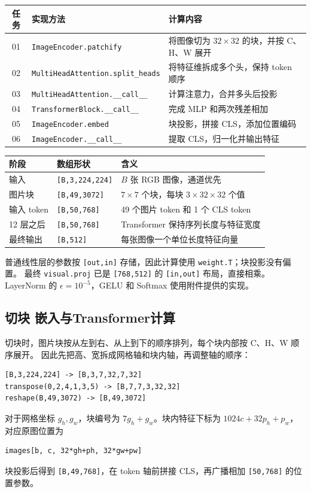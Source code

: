 \documentclass[a4paper,12pt]{article}
\newcommand{\shape}[1]{\texttt{#1}}
\newcommand{\file}[1]{\nolinkurl{#1}}
\begin{document}
\noindent\begin{tabularx}{\textwidth}{@{}c>{\raggedright\arraybackslash}p{5.1cm}X@{}}
\toprule
\textbf{任务} & \textbf{实现方法} & \textbf{计算内容} \\
\midrule
01 & \file{ImageEncoder.patchify} & 将图像切为 $32\times32$ 的块，并按 C、H、W 展开 \\
02 & \file{MultiHeadAttention.split_heads} & 将特征维拆成多个头，保持 token 顺序 \\
03 & \file{MultiHeadAttention.__call__} & 计算注意力，合并多头后投影 \\
04 & \file{TransformerBlock.__call__} & 完成 MLP 和两次残差相加 \\
05 & \file{ImageEncoder.embed} & 块投影，拼接 CLS，添加位置编码 \\
06 & \file{ImageEncoder.__call__} & 提取 CLS，归一化并输出特征 \\
\bottomrule
\end{tabularx}
\noindent\begin{tabularx}{\textwidth}{@{}l l X@{}}
\toprule
\textbf{阶段} & \textbf{数组形状} & \textbf{含义} \\
\midrule
输入 & \shape{[B,3,224,224]} & $B$ 张 RGB 图像，通道优先 \\
图片块 & \shape{[B,49,3072]} & $7\times7$ 个块，每块 $3\times32\times32$ 个值 \\
输入 token & \shape{[B,50,768]} & 49 个图片 token 和 1 个 CLS token \\
12 层之后 & \shape{[B,50,768]} & Transformer 保持序列长度与特征宽度 \\
最终输出 & \shape{[B,512]} & 每张图像一个单位长度特征向量 \\
\bottomrule
\end{tabularx}

普通线性层的参数按 \shape{[out,in]} 存储，因此计算使用 \file{weight.T}；块投影没有偏置。
最终 \file{visual.proj} 已是 \shape{[768,512]} 的 \shape{[in,out]} 布局，直接相乘。
LayerNorm 的 $\epsilon=10^{-5}$，GELU 和 Softmax 使用附件提供的实现。
\subsection{切块 嵌入与Transformer计算}
切块时，图片块按从左到右、从上到下的顺序排列，每个块内部按 C、H、W 顺序展开。
因此先把高、宽拆成网格轴和块内轴，再调整轴的顺序：
\begin{lstlisting}
[B,3,224,224] -> [B,3,7,32,7,32]
transpose(0,2,4,1,3,5) -> [B,7,7,3,32,32]
reshape(B,49,3072) -> [B,49,3072]
\end{lstlisting}
对于网格坐标 $g_h,g_w$，块编号为 $7g_h+g_w$。块内特征下标为 $1024c+32p_h+p_w$，对应原图位置为
\begin{lstlisting}
images[b, c, 32*gh+ph, 32*gw+pw]
\end{lstlisting}
块投影后得到 \shape{[B,49,768]}，在 token 轴前拼接 CLS，再广播相加 \shape{[50,768]} 的位置参数。
\end{document}
